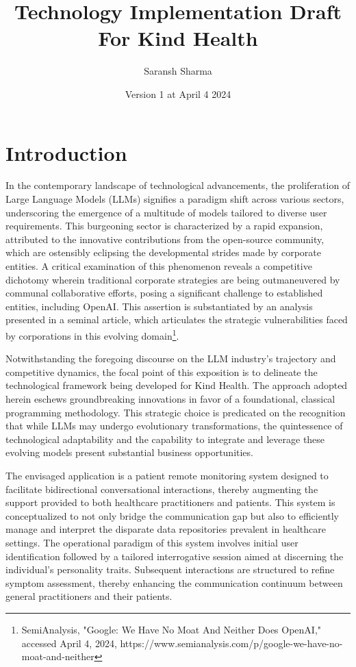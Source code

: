 \documentclass{article}
\begin{document}
\title{ Technology Implementation Draft For Kind Health}
\author{Saransh Sharma}
\date{Version 1 at April 4 2024}


\maketitle


\section{Introduction}

In the contemporary landscape of technological advancements, the proliferation of Large Language Models (LLMs) signifies a paradigm shift across various sectors, underscoring the emergence of a multitude of models tailored to diverse user requirements. This burgeoning sector is characterized by a rapid expansion, attributed to the innovative contributions from the open-source community, which are ostensibly eclipsing the developmental strides made by corporate entities. A critical examination of this phenomenon reveals a competitive dichotomy wherein traditional corporate strategies are being outmaneuvered by communal collaborative efforts, posing a significant challenge to established entities, including OpenAI. This assertion is substantiated by an analysis presented in a seminal article, which articulates the strategic vulnerabilities faced by corporations in this evolving domain\footnote{SemiAnalysis, "Google: We Have No Moat And Neither Does OpenAI," accessed April 4, 2024, https://www.semianalysis.com/p/google-we-have-no-moat-and-neither}.

Notwithstanding the foregoing discourse on the LLM industry's trajectory and competitive dynamics, the focal point of this exposition is to delineate the technological framework being developed for Kind Health. The approach adopted herein eschews groundbreaking innovations in favor of a foundational, classical programming methodology. This strategic choice is predicated on the recognition that while LLMs may undergo evolutionary transformations, the quintessence of technological adaptability and the capability to integrate and leverage these evolving models present substantial business opportunities.

The envisaged application is a patient remote monitoring system designed to facilitate bidirectional conversational interactions, thereby augmenting the support provided to both healthcare practitioners and patients. This system is conceptualized to not only bridge the communication gap but also to efficiently manage and interpret the disparate data repositories prevalent in healthcare settings. The operational paradigm of this system involves initial user identification followed by a tailored interrogative session aimed at discerning the individual's personality traits. Subsequent interactions are structured to refine symptom assessment, thereby enhancing the communication continuum between general practitioners and their patients.
\end{document}
